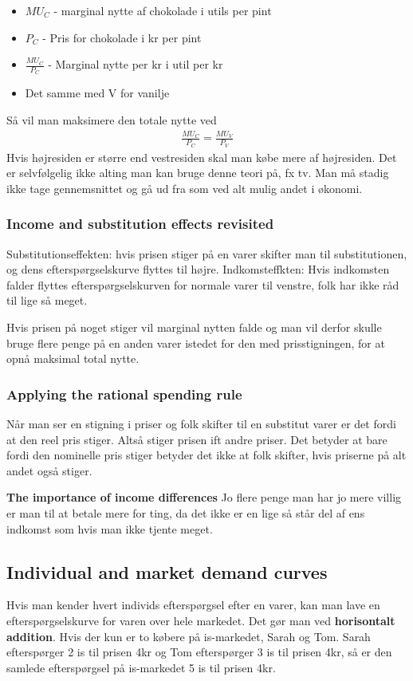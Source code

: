 \begin{itemize}
    \item $MU_C$ - marginal nytte af chokolade i utils per pint
    \item $P_C$ - Pris for chokolade i kr per pint
    \item $\frac{MU_C}{P_C}$ - Marginal nytte per kr i util per kr
    \item Det samme med V for vanilje
\end{itemize}
Så vil man maksimere den totale nytte ved
\begin{align*}
    \frac{MU_C}{P_C} = \frac{MU_V}{P_V}
\end{align*}
Hvis højresiden er større end vestresiden skal man købe mere af højresiden. Det er selvfølgelig ikke alting man kan bruge denne teori på, fx tv. Man må stadig ikke tage gennemsnittet og gå ud fra som ved alt mulig andet i økonomi. 

\subsubsection{Income and substitution effects revisited}
Substitutionseffekten: hvis prisen stiger på en varer skifter man til substitutionen, og dens efterspørgselskurve flyttes til højre. Indkomsteffkten: Hvis indkomsten falder flyttes efterspørgselskurven for normale varer til venstre, folk har ikke råd til lige så meget. 

Hvis prisen på noget stiger vil marginal nytten falde og man vil derfor skulle bruge flere penge på en anden varer istedet for den med prisstigningen, for at opnå maksimal total nytte. 
\subsubsection{Applying the rational spending rule}
Når man ser en stigning i priser og folk skifter til en substitut varer er det fordi at den reel pris stiger. Altså stiger prisen ift andre priser. Det betyder at bare fordi den nominelle pris stiger betyder det ikke at folk skifter, hvis priserne på alt andet også stiger. 

\textbf{The importance of income differences}
Jo flere penge man har jo mere villig er man til at betale mere for ting, da det ikke er en lige så står del af ens indkomst som hvis man ikke tjente meget. 

\subsection{Individual and market demand curves}
Hvis man kender hvert individs efterspørgsel efter en varer, kan man lave en efterspørgselskurve for varen over hele markedet. Det gør man ved \textbf{horisontalt addition}. Hvis der kun er to købere på is-markedet, Sarah og Tom. Sarah efterspørger 2 is til prisen 4kr og Tom efterspørger 3 is til prisen 4kr, så er den samlede efterspørgsel på is-markedet 5 is til prisen 4kr. 


